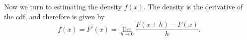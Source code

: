 \documentclass{article}
\newenvironment{colorparagraph}[1]{\par\color{#1}}{\par}
\begin{document}






      
        
      

\begin{colorparagraph}{questioncolor}
Now we turn to estimating the density \( f(x) \). The density is the derivative of the cdf, and therefore is given by
\[
f(x) = F'(x) = \lim_{h \to 0} \frac{F(x + h) - F(x)}{h}.
\]
\end{colorparagraph}
\end{document}
